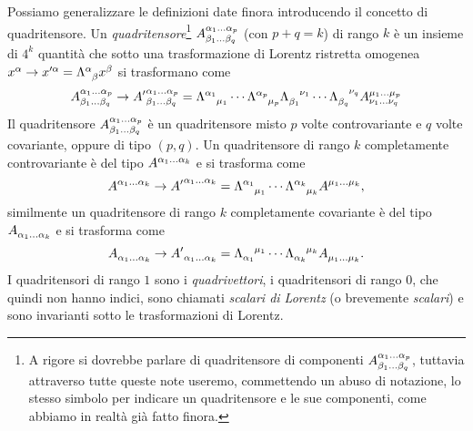 Possiamo generalizzare le definizioni date finora introducendo il concetto di
quadritensore.  Un
\emph{quadritensore}\footnote{A rigore si dovrebbe parlare
  di quadritensore di componenti
  $\tensor*{A}{^{\alpha_{1}\dots\alpha_{p}}_{\beta_{1}\dots\beta_{q}}}$,
  tuttavia attraverso tutte queste note useremo, commettendo un abuso di
  notazione, lo stesso simbolo per indicare un quadritensore e le sue
  componenti, come abbiamo in realtà già fatto finora.}
$\tensor*{A}{^{\alpha_{1}\dots\alpha_{p}}_{\beta_{1}\dots\beta_{q}}}$ (con
$p + q = k$) di rango $k$ è un insieme di $4^{k}$ quantità che sotto una
trasformazione di Lorentz ristretta omogenea
$x^{\alpha} \to x'^{\alpha} = \tensor{\Lambda}{^{\alpha}_{\beta}}x^{\beta}$ si
trasformano come
\begin{equation}
  \tensor*{A}{^{\alpha_{1}\dots\alpha_{p}}_{\beta_{1}\dots\beta_{q}}} \to
  \tensor*{{A'}}{^{\alpha_{1}\dots\alpha_{p}}_{\beta_{1}\dots\beta_{q}}} =
  \tensor{\Lambda}{^{\alpha_{1}}_{\mu_{1}}} \cdots
  \tensor{\Lambda}{^{\alpha_{p}}_{\mu_{p}}}
  \tensor{\Lambda}{_{\beta_{1}}^{\nu_{1}}} \cdots
  \tensor{\Lambda}{_{\beta_{q}}^{\nu_{q}}}
  \tensor*{A}{^{\mu_{1}\dots\mu_{p}}_{\nu_{1}\dots\nu_{q}}}
\end{equation}
Il quadritensore
$\tensor*{A}{^{\alpha_{1}\dots\alpha_{p}}_{\beta_{1}\dots\beta_{q}}}$ è un
quadritensore misto $p$ volte controvariante e $q$ volte covariante, oppure di
tipo $(p,q)$.  Un quadritensore di rango $k$ completamente controvariante è del
tipo $\tensor{A}{^{\alpha_{1}\dots\alpha_{k}}}$ e si trasforma come
\begin{equation}
  \tensor{A}{^{\alpha_{1}\dots\alpha_{k}}} \to
  \tensor{{A'}}{^{\alpha_{1}\dots\alpha_{k}}} =
  \tensor{\Lambda}{^{\alpha_{1}}_{\mu_{1}}} \cdots
  \tensor{\Lambda}{^{\alpha_{k}}_{\mu_{k}}} \tensor{A}{^{\mu_{1}\dots\mu_{k}}},
\end{equation}
similmente un quadritensore di rango $k$ completamente covariante è del tipo
$\tensor{A}{_{\alpha_{1}\dots\alpha_{k}}}$ e si trasforma come
\begin{equation}
  \tensor{A}{_{\alpha_{1}\dots\alpha_{k}}} \to
  \tensor{{A'}}{_{\alpha_{1}\dots\alpha_{k}}} =
  \tensor{\Lambda}{_{\alpha_{1}}^{\mu_{1}}} \cdots
  \tensor{\Lambda}{_{\alpha_{k}}^{\mu_{k}}} \tensor{A}{_{\mu_{1}\dots\mu_{k}}}.
\end{equation}
I quadritensori di rango $1$ sono i \emph{quadrivettori}, i
quadritensori di rango $0$, che quindi non hanno indici, sono chiamati
\emph{scalari di Lorentz} (o brevemente \emph{scalari}) e sono
invarianti sotto le trasformazioni di Lorentz.


